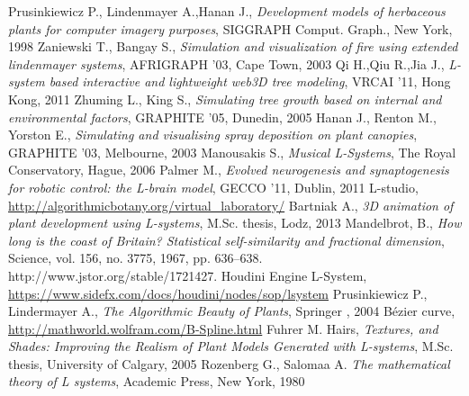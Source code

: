 \documentclass[b5paper,twoside,11pt]{article}
\begin{document}
\begin{thebibliography}{99}
\small
{}Prusinkiewicz P., Lindenmayer A.,Hanan J., \textit{Development models of herbaceous plants for computer imagery purposes}, SIGGRAPH Comput. Graph., New York, 1998
 Zaniewski T., Bangay S., \textit{Simulation and visualization of fire using extended lindenmayer systems}, AFRIGRAPH '03, Cape Town, 2003
Qi H.,Qiu R.,Jia J., \textit{L-system based interactive and lightweight web3D tree modeling}, VRCAI '11, Hong Kong, 2011
Zhuming L., King S., \textit{Simulating tree growth based on internal and environmental factors}, GRAPHITE '05, Dunedin, 2005
Hanan J., Renton M., Yorston E., \textit{Simulating and visualising spray deposition on plant canopies}, GRAPHITE '03, Melbourne, 2003
Manousakis S., \textit{Musical L-Systems}, The Royal Conservatory, Hague, 2006
Palmer M., \textit{Evolved neurogenesis and synaptogenesis for robotic control: the L-brain model}, GECCO '11, Dublin, 2011
L-studio, \url{http://algorithmicbotany.org/virtual_laboratory/}
Bartniak A., \textit{3D animation of plant development using L-systems}, M.Sc. thesis, Lodz, 2013
Mandelbrot, B., \textit{How long is the coast of Britain? Statistical self-similarity and fractional dimension}, Science, vol. 156, no. 3775, 1967, pp. 636–638. http://www.jstor.org/stable/1721427.
Houdini Engine L-System, \url{https://www.sidefx.com/docs/houdini/nodes/sop/lsystem}
Prusinkiewicz P., Lindermayer A., \textit{The Algorithmic Beauty of Plants}, Springer , 2004
Bézier curve, \url {http://mathworld.wolfram.com/B-Spline.html}
Fuhrer M. Hairs, \textit{Textures, and Shades: Improving the Realism of Plant Models Generated with L-systems}, M.Sc. thesis, University of Calgary, 2005
 Rozenberg G., Salomaa A. \textit{The mathematical theory of L systems}, Academic Press, New York, 1980

\end{thebibliography}

\ifdefined\PROCINCLUDED
%
\else
\end{document}
